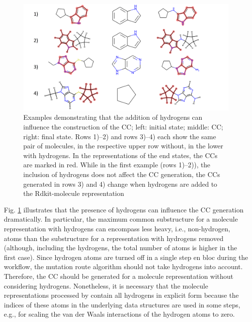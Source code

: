 \begin{figure}
	
	\includegraphics[scale=0.13]{hydrogens_plus_minus_v2.png}
	\caption{Examples demonstrating that the addition of hydrogens can influence the construction of the CC; left: initial state; middle: CC; right: final state. Rows 1)--2) and rows 3)--4) each show the same pair of molecules, in the respective upper row without,
		in the lower with hydrogens. In the representations of the end states, the CCs are marked in red. While in the first example (rows 1)--2)), the inclusion of hydrogens does not affect the CC generation, the CCs generated in rows 3) and 4)  change when hydrogens are added to the Rdkit-molecule
		representation}
		\label{fig:hydrogen_effect}
\end{figure}

Fig. \ref{fig:hydrogen_effect} illustrates that the presence of hydrogens can influence the CC generation dramatically. In particular, the maximum common substructure for a molecule representation with hydrogens can encompass less heavy, i.e., non-hydrogen, atoms than the substructure for a representation with hydrogens removed (although, including the hydrogens, the total number of atoms is higher in the first case). 
Since hydrogen atoms are turned off in a single step en bloc during the {\trafo} workflow, the mutation route algorithm should not take hydrogens into account. Therefore, the CC should be generated for a molecule representation without considering hydrogens.
Nonetheless, it is necessary that the molecule representations processed by \trafo contain all hydrogens in explicit form because the indices of these atoms in the underlying data structures are used in some steps, e.g., for scaling the van der Waals interactions of the hydrogen atoms to zero.


